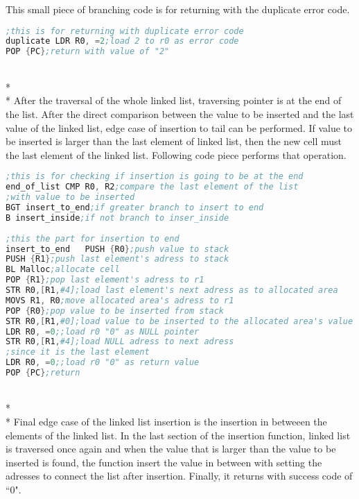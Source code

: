 \documentclass[pdftex,12pt,a4paper]{article}
\begin{document}
\quad This small piece of branching code is for returning with the duplicate error code.
\begin{lstlisting}[language=Assembler]
;this is for returning with duplicate error code
duplicate LDR R0, =2;load 2 to r0 as error code
POP {PC};return with value of "2"
\end{lstlisting}\\*\\*
\quad After the traversal of the whole linked list, traversing pointer is at the end of the list. After the direct comparison between the value to be inserted and the last value of the linked list, edge case of insertion to tail can be performed. If value to be inserted is larger than the last element of linked list, then the new cell must the last element of the linked list. Following code piece performs that operation.
\begin{lstlisting}[language=Assembler]
;this is for checking if insertion is going to be at the end
end_of_list CMP R0, R2;compare the last element of the list
;with value to be inserted
BGT	insert_to_end;if greater branch to insert to end
B insert_inside;if not branch to inser_inside
		
;this the part for insertion to end
insert_to_end	PUSH {R0};push value to stack
PUSH {R1};push last element's adress to stack
BL Malloc;allocate cell
POP {R1};pop last element's adress to r1
STR R0,[R1,#4];load last element's next adress as to allocated area
MOVS R1, R0;move allocated area's adress to r1
POP {R0};pop value to be inserted from stack
STR R0,[R1,#0];load value to be inserted to the allocated area's value
LDR R0, =0;;load r0 "0" as NULL pointer
STR R0,[R1,#4];load NULL adress to next adress 
;since it is the last element
LDR R0, =0;;load r0 "0" as return value
POP {PC};return
\end{lstlisting}\\*\\*
\quad Final edge case of the linked list insertion is the insertion in betweeen the elements of the linked list. In the last section of the insertion function, linked list is traversed once again and when the value that is larger than the value to be inserted is found, the function insert the value in between with setting the adresses to connect the list after insertion. Finally, it returns with success code of ``0".
\end{document}
